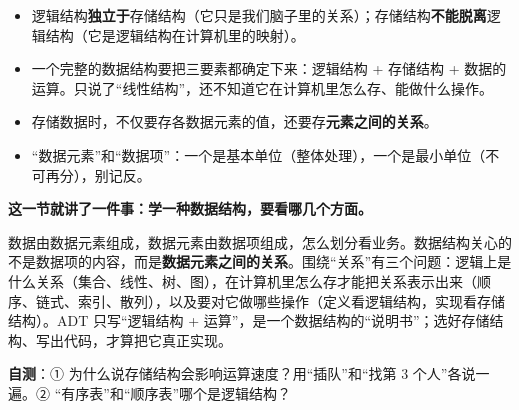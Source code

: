 \documentclass[10.5pt,a4paper,oneside]{article}
\newcommand{\hlred}[1]{\textcolor{wdred}{\bfseries #1}}
\providecommand{\tightlist}{\setlength{\itemsep}{2pt}\setlength{\parskip}{0pt}}
\begin{document}
\begin{pitfallbox}

\begin{itemize}
\tightlist
\item
  逻辑结构\textbf{独立于}存储结构（它只是我们脑子里的关系）；存储结构\textbf{不能脱离}逻辑结构（它是逻辑结构在计算机里的映射）。
\item
  一个完整的数据结构要把三要素都确定下来：逻辑结构 + 存储结构 +
  数据的运算。只说了“线性结构”，还不知道它在计算机里怎么存、能做什么操作。
\item
  存储数据时，不仅要存各数据元素的值，还要存\hlred{元素之间的关系}。
\item
  “数据元素”和“数据项”：一个是基本单位（整体处理），一个是最小单位（不可再分），别记反。
\end{itemize}

\end{pitfallbox}

\begin{summarybox}

\textbf{这一节就讲了一件事：学一种数据结构，要看哪几个方面。}

数据由数据元素组成，数据元素由数据项组成，怎么划分看业务。数据结构关心的不是数据项的内容，而是\textbf{数据元素之间的关系}。围绕“关系”有三个问题：逻辑上是什么关系（集合、线性、树、图），在计算机里怎么存才能把关系表示出来（顺序、链式、索引、散列），以及要对它做哪些操作（定义看逻辑结构，实现看存储结构）。ADT
只写“逻辑结构 +
运算”，是一个数据结构的“说明书”；选好存储结构、写出代码，才算把它真正实现。

\textbf{自测}：① 为什么说存储结构会影响运算速度？用“插队”和“找第 3
个人”各说一遍。② “有序表”和“顺序表”哪个是逻辑结构？

\end{summarybox}
\end{document}
